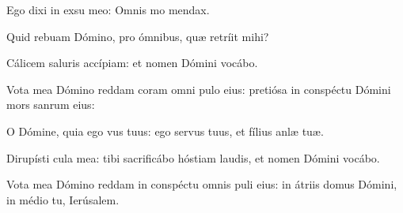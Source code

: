 \item {}

\item Ego dixi in exsu meo:\psstar{} Omnis mo mendax.

\item Quid rebuam Dómino,\psstar{} pro ómnibus, quæ retríit mihi?

\item Cálicem saluris accípiam:\psstar{} et nomen Dómini vocábo.

\item Vota mea Dómino reddam coram omni pulo eius:\psstar{} pretiósa in conspéctu Dómini mors sanrum eius:

\item O Dómine, quia ego vus tuus:\psstar{} ego servus tuus, et fílius anlæ tuæ.

\item Dirupísti cula mea:\psstar{} tibi sacrificábo hóstiam laudis, et nomen Dómini vocábo.

\item Vota mea Dómino reddam in conspéctu omnis puli eius:\psstar{} in átriis domus Dómini, in médio tu, Ierúsalem.
